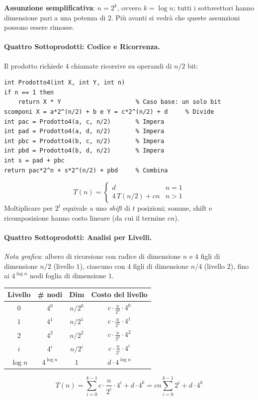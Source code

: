 \documentclass[12pt, a4paper]{article}
\begin{document}
\textbf{Assunzione semplificativa}: $n=2^k$, ovvero $k=\log n$; tutti i sottovettori hanno dimensione pari a una potenza di $2$. Più avanti si vedrà che queste assunzioni possono essere rimosse.

\paragraph{Quattro Sottoprodotti: Codice e Ricorrenza.}
Il prodotto richiede $4$ chiamate ricorsive su operandi di $n/2$ bit:
\begin{verbatim}
int Prodotto4(int X, int Y, int n)
if n == 1 then
    return X * Y                     % Caso base: un solo bit
scomponi X = a*2^(n/2) + b e Y = c*2^(n/2) + d     % Divide
int pac = Prodotto4(a, c, n/2)       % Impera
int pad = Prodotto4(a, d, n/2)       % Impera
int pbc = Prodotto4(b, c, n/2)       % Impera
int pbd = Prodotto4(b, d, n/2)       % Impera
int s = pad + pbc
return pac*2^n + s*2^(n/2) + pbd     % Combina
\end{verbatim}
$$T(n) = \begin{cases} d & n = 1 \\ 4\,T(n/2) + cn & n > 1 \end{cases}$$
Moltiplicare per $2^t$ equivale a uno \textit{shift} di $t$ posizioni; somme, shift e ricomposizione hanno costo lineare (da cui il termine $cn$).

\paragraph{Quattro Sottoprodotti: Analisi per Livelli.}
\textit{Nota grafica}: albero di ricorsione con radice di dimensione $n$ e $4$ figli di dimensione $n/2$ (livello $1$), ciascuno con $4$ figli di dimensione $n/4$ (livello $2$), fino ai $4^{\log n}$ nodi foglia di dimensione $1$.

\begin{center}
\begin{tabular}{cccc}
\toprule
\textbf{Livello} & \textbf{\# nodi} & \textbf{Dim} & \textbf{Costo del livello} \\
\midrule
$0$ & $4^0$ & $n/2^0$ & $c\cdot\frac{n}{2^0}\cdot 4^0$ \\
$1$ & $4^1$ & $n/2^1$ & $c\cdot\frac{n}{2^1}\cdot 4^1$ \\
$2$ & $4^2$ & $n/2^2$ & $c\cdot\frac{n}{2^2}\cdot 4^2$ \\
$i$ & $4^i$ & $n/2^i$ & $c\cdot\frac{n}{2^i}\cdot 4^i$ \\
$\log n$ & $4^{\log n}$ & $1$ & $d\cdot 4^{\log n}$ \\
\bottomrule
\end{tabular}
\end{center}
$$T(n) = \sum_{i=0}^{k-1} c\cdot\frac{n}{2^i}\cdot 4^i + d\cdot 4^k = cn\sum_{i=0}^{k-1}2^i + d\cdot 4^k$$
\end{document}
